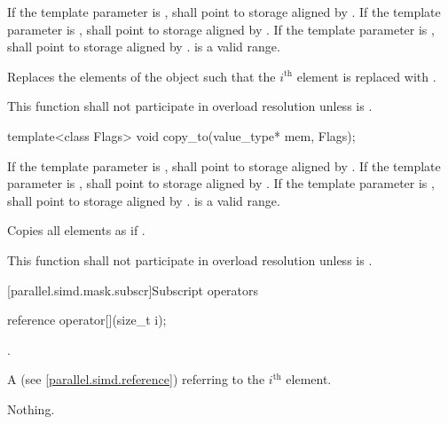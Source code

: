 \begin{itemdescr}
  \pnum\requires
  If the template parameter  is ,  shall point to storage aligned by . If the template parameter  is ,  shall point to storage aligned by . If the template parameter  is ,  shall point to storage aligned by . \tcode{[mem, mem + size())} is a valid range.

  \pnum\effects
  Replaces the elements of the  object such that the $i^\text{th}$ element is replaced with  \foralli.

  \pnum\remarks
  This function shall not participate in overload resolution unless  is .

\end{itemdescr}

\begin{itemdecl}
template<class Flags> void copy_to(value_type* mem, Flags);
\end{itemdecl}

\begin{itemdescr}
  \pnum\requires
  If the template parameter  is ,  shall point to storage aligned by . If the template parameter  is ,  shall point to storage aligned by . If the template parameter  is ,  shall point to storage aligned by . \tcode{[mem, mem + size())} is a valid range.

  \pnum\effects
  Copies all  elements as if  \foralli.

  \pnum\remarks
  This function shall not participate in overload resolution unless  is .
\end{itemdescr}

[parallel.simd.mask.subscr]{Subscript operators}

\begin{itemdecl}
reference operator[](size_t i);
\end{itemdecl}

\begin{itemdescr}
  \pnum\requires
  .

  \pnum\returns
  A  (see \ref{parallel.simd.reference}) referring to the $i^\text{th}$ element.

  \pnum\throws Nothing.
\end{itemdescr}

